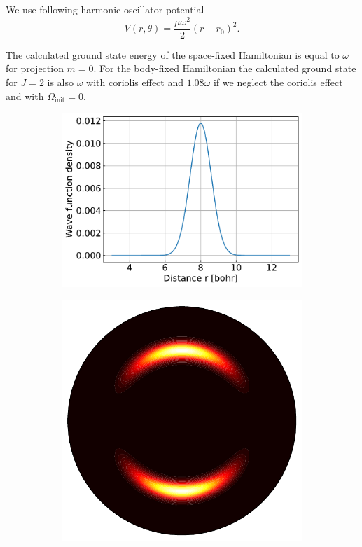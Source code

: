 \documentclass{article}
\begin{document}
    We use following harmonic oscillator potential
    \begin{equation}
        V(r, \theta) = \frac{\mu \omega^2}{2} (r - r_0)^2.
    \end{equation}

    The calculated ground state energy of the space-fixed Hamiltonian is equal to $\omega$ for projection $m = 0$.
    For the body-fixed Hamiltonian the calculated ground state for $J = 2$ is also $\omega$ with 
    coriolis effect and $1.08\omega$ if we neglect the coriolis effect and with $\Omega_\text{init} = 0$.

    \begin{figure}[H]
        \centering
        \begin{subfigure}{.4\linewidth}
            \centering
            \includegraphics[width=\linewidth]{harmonic_iso_distance.pdf}
        \end{subfigure}
        \begin{subfigure}{.4\linewidth}
            \centering
            \includegraphics[width=\linewidth]{harmonic_iso_wave.pdf}

\end{subfigure}
\end{figure}
\end{document}

